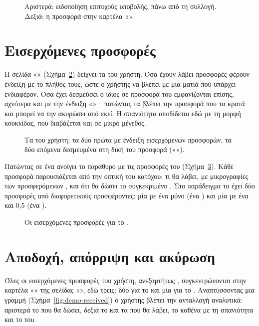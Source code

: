 \begin{figure}[H]
\centering
{}
\caption{Αριστερά: ειδοποίηση επιτυχούς υποβολής, πάνω από τη συλλογή. Δεξιά: η προσφορά
στην καρτέλα «».}
\label{fig:demo-placed}
\end{figure}

\section{Εισερχόμενες προσφορές}
\label{sec:demo-incoming}

Η σελίδα «» (Σχήμα~\ref{fig:demo-mynfts}) δείχνει τα  του χρήστη. Όσα
έχουν λάβει προσφορές φέρουν ένδειξη με το πλήθος τους, ώστε ο χρήστης να βλέπει με μια
ματιά πού υπάρχει ενδιαφέρον. Όσα έχει δεσμεύσει ο ίδιος σε προσφορά του εμφανίζονται
επίσης, αχνότερα και με την ένδειξη «»· πατώντας τα βλέπει την προσφορά που
τα κρατά και μπορεί να την ακυρώσει από εκεί. Η σπανιότητα αποδίδεται εδώ με τη μορφή
κουκκίδας, που διαβάζεται και σε μικρό μέγεθος.

\begin{figure}[H]
\centering
{}
\caption{Τα  του χρήστη: τα δύο πρώτα με ένδειξη εισερχόμενων προσφορών, τα δύο
επόμενα δεσμευμένα στη δική του προσφορά («»).}
\label{fig:demo-mynfts}
\end{figure}

Πατώντας σε ένα  ανοίγει το παράθυρο με τις προσφορές του
(Σχήμα~\ref{fig:demo-incoming}). Κάθε προσφορά παρουσιάζεται από την οπτική του κατόχου:
τι θα λάβει, με μικρογραφίες των προσφερόμενων , και ότι θα δώσει το συγκεκριμένο
. Στο παράδειγμα το  έχει δύο προσφορές από διαφορετικούς
προσφέροντες: μία με ένα  μόνο (ένα ) και μία με ένα 
και 0{,}5  (ένα ).

\begin{figure}[H]
\centering
{}
\caption{Οι εισερχόμενες προσφορές για το .}
\label{fig:demo-incoming}
\end{figure}

\section{Αποδοχή, απόρριψη και ακύρωση}
\label{sec:demo-settle}

Όλες οι εισερχόμενες προσφορές του χρήστη, ανεξαρτήτως , συγκεντρώνονται στην
καρτέλα «» της σελίδας «», εδώ τρεις: δύο για το  και μία για το . Αναπτύσσοντας μια γραμμή
(Σχήμα~\ref{fig:demo-received}) ο χρήστης βλέπει την ανταλλαγή αναλυτικά: αριστερά το
 που θα δώσει, δεξιά το  και τα  που θα λάβει, το καθένα με τη
σπανιότητα και το  του.

